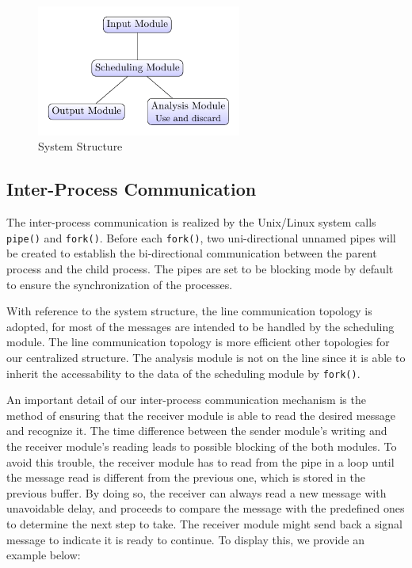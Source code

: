 \documentclass[a4paper, 12pt]{article}
\begin{document}
\begin{figure}[htbp]
    \centering
    \includegraphics[width=0.6\textwidth]{figure/tikz_pic1.pdf}
    \caption{System Structure}
\end{figure}

\subsection{Inter-Process Communication}

The inter-process communication is realized by the Unix/Linux system calls \texttt{pipe()} and \texttt{fork()}. Before each \texttt{fork()}, two uni-directional unnamed pipes will be created to establish the bi-directional communication between the parent process and the child process.
The pipes are set to be blocking mode by default to ensure the synchronization of the processes.

With reference to the system structure, the line communication topology is adopted, for most of the messages are intended to be 
handled by the scheduling module. The line communication topology is more efficient other topologies for our centralized structure.
The analysis module is not on the line since it is able to inherit the accessability to the data of the scheduling module by \texttt{fork()}.

An important detail of our inter-process communication mechanism is the method of ensuring that the receiver module is able to
read the desired message and recognize it. The time difference between the sender module's writing and the receiver module's reading 
leads to possible blocking of the both modules. To avoid this trouble, the receiver module has to read from the pipe in a loop until
the message read is different from the previous one, which is stored in the previous buffer. By doing so, the receiver can always read a new message with 
unavoidable delay, and proceeds to compare the message with the predefined ones to determine the next step to take.
The receiver module might send back a signal message to indicate it is ready to continue. To display this, we provide an example below:
\end{document}
